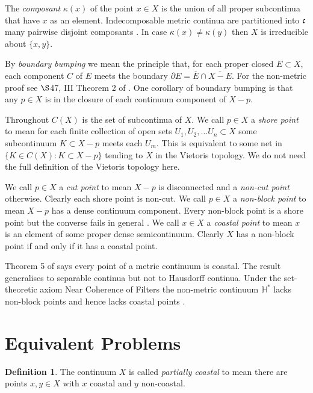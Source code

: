 \documentclass[12pt]{article}
\theoremstyle{plain}
\theoremstyle{definition}
\newtheorem{definition}[theorem]{Definition}
\newcommand{\K}{\ensuremath{\kappa}}
\newcommand{\HH}{\ensuremath{\mathbb H}}
\newcommand{\0}{\ensuremath{\varnothing}}
\newcommand{\DD}{\ensuremath{\partial}}
\newcommand{\cn}{\ensuremath{\frak c}}
\begin{document}
The \textit{composant} $\K(x)$ of the point $x \in X$ is the union of all proper subcontinua that have $x$ as an element.
Indecomposable metric continua are partitioned into $\cn$ many pairwise disjoint composants \cite{Ccomposants}.
In case $\K(x) \ne \K(y)$ then $X$ is irreducible about $\{x,y\}$.

By \textit{boundary bumping} we mean the principle that, for each proper closed $E \subset X$, each component $C$ of $E$ meets the boundary $\DD E = \overline E \cap \overline {X-E}$.
For the non-metric proof see $\S$47, III Theorem 2 of \cite{kur2}. 
One corollary of boundary bumping is that any $p \in X$ is in the closure of each continuum component of $X-p$.


Throughout $C(X)$ is the set of subcontinua of $X$.
We call $p \in X$ a \textit{shore point} to mean for each finite collection of open sets $U_1,U_2, \ldots U_n \subset X$
some subcontinuum $K \subset X-p$ meets each $U_m$.
This is equivalent to some net in $\{K \in C(X): K \subset X - p\}$ tending to $X$ in the Vietoris topology.
We do not need the full definition of the Vietoris topology here.

We call $p \in X$ a \textit{cut point} to mean $X-p$ is disconnected and a \textit{non-cut point} otherwise.
Clearly each shore point is non-cut.
We call $p \in X$ a \textit{non-block point} to mean $X-p$ has a dense continuum component.
Every non-block point is a shore point but the converse fails in general \cite{B}.
We call $x \in X$ a \textit{coastal point} to mean $x$ is an element of some proper dense semicontinuum.
Clearly $X$ has a non-block point if and only if it has a coastal point.

Theorem 5 of \cite{Bing01} says every point of a metric continuum is coastal.
The result generalises to separable continua \cite{Me1} but not to Hausdorff continua.
Under the set-theoretic axiom Near Coherence of Filters the non-metric continuum $\HH^*$ lacks non-block points and hence lacks coastal points \cite{Me2}.


\section{Equivalent Problems}

\begin{definition}

The continuum $X$ is called \textit{partially coastal} to mean there are points $x,y \in X$ with $x$ coastal and $y$ non-coastal.

\end{definition}
\end{document}
